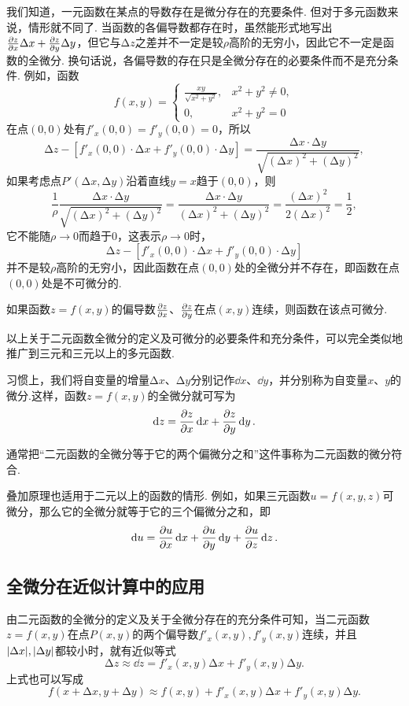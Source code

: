 我们知道，一元函数在某点的导数存在是微分存在的充要条件.
但对于多元函数来说，情形就不同了.
当函数的各偏导数都存在时，虽然能形式地写出\(\pdv{z}{x} \Delta x + \pdv{z}{y} \Delta y\)，但它与\(\increment z\)之差并不一定是较\(\rho\)高阶的无穷小，因此它不一定是函数的全微分.
换句话说，各偏导数的存在只是全微分存在的必要条件而不是充分条件.
例如，函数\[
f(x,y) = \left\{ \begin{array}{cl}
\frac{xy}{\sqrt{x^2+y^2}}, & x^2+y^2 \neq 0, \\
0, & x^2+y^2 = 0
\end{array} \right.
\]在点\((0,0)\)处有\(f'_x(0,0) = f'_y(0,0) = 0\)，所以\[
\increment z - [f'_x(0,0) \cdot \increment x + f'_y(0,0) \cdot \increment y]
= \frac{\increment x \cdot \increment y}{\sqrt{(\increment x)^2+(\increment y)^2}},
\]如果考虑点\(P'(\increment x,\increment y)\)沿着直线\(y=x\)趋于\((0,0)\)，则\[
\frac{1}{\rho} \frac{\increment x \cdot \increment y}{\sqrt{(\increment x)^2+(\increment y)^2}}
= \frac{\increment x \cdot \increment y}{(\increment x)^2+(\increment y)^2}
= \frac{(\increment x)^2}{2(\increment x)^2}
= \frac{1}{2},
\]它不能随\(\rho\to0\)而趋于\(0\)，这表示\(\rho\to0\)时，\[
\increment z - [f'_x(0,0) \cdot \increment x + f'_y(0,0) \cdot \increment y]
\]并不是较\(\rho\)高阶的无穷小，因此函数在点\((0,0)\)处的全微分并不存在，即函数在点\((0,0)\)处是不可微分的.

\begin{theorem}[充分条件]\label{theorem:多元函数微分法.二元函数可微的充分条件}
如果函数\(z=f(x,y)\)的偏导数\(\pdv{z}{x}\)、\(\pdv{z}{y}\)在点\((x,y)\)连续，则函数在该点可微分.
\end{theorem}

以上关于二元函数全微分的定义及可微分的必要条件和充分条件，可以完全类似地推广到三元和三元以上的多元函数.

习惯上，我们将自变量的增量\(\increment x\)、\(\increment y\)分别记作\(\dd{x}\)、\(\dd{y}\)，并分别称为自变量\(x\)、\(y\)的微分.这样，函数\(z=f(x,y)\)的全微分就可写为\[
\dd{z}=\pdv{z}{x}\dd{x}+\pdv{z}{y}\dd{y}.
\]

通常把“二元函数的全微分等于它的两个偏微分之和”这件事称为二元函数的微分符合.

叠加原理也适用于二元以上的函数的情形.
例如，如果三元函数\(u = f(x,y,z)\)可微分，那么它的全微分就等于它的三个偏微分之和，即\[
\dd{u} = \pdv{u}{x} \dd{x} + \pdv{u}{y} \dd{y} + \pdv{u}{z} \dd{z}.
\]

\subsection{全微分在近似计算中的应用}
由二元函数的全微分的定义及关于全微分存在的充分条件可知，当二元函数\(z = f(x,y)\)在点\(P(x,y)\)的两个偏导数\(f'_x(x,y),f'_y(x,y)\)连续，并且\(\abs{\Delta x},\abs{\Delta y}\)都较小时，就有近似等式\[
\increment z \approx \dd{z} = f'_x(x,y) \increment x + f'_y(x,y) \increment y.
\]上式也可以写成\[
f(x+\increment x,y+\increment y) \approx f(x,y) + f'_x(x,y) \increment x + f'_y(x,y) \increment y.
\]

